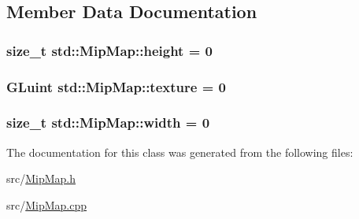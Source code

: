 \subsection{Member Data Documentation}
\hypertarget{classstd_1_1MipMap_a3baac3b8d33da5400b4a4bbca8604436}{}
\subsubsection[{height}]{\setlength{\rightskip}{0pt plus 5cm}size\+\_\+t std\+::\+Mip\+Map\+::height = 0\hspace{0.3cm}{\ttfamily [private]}}\label{classstd_1_1MipMap_a3baac3b8d33da5400b4a4bbca8604436}
\hypertarget{classstd_1_1MipMap_a9ae62495e98f75e2d545634a0a8b4a61}{}
\subsubsection[{texture}]{\setlength{\rightskip}{0pt plus 5cm}G\+Luint std\+::\+Mip\+Map\+::texture = 0\hspace{0.3cm}{\ttfamily [private]}}\label{classstd_1_1MipMap_a9ae62495e98f75e2d545634a0a8b4a61}
\hypertarget{classstd_1_1MipMap_aa7c7e74f1f05b2d8244f1d06289b18b4}{}
\subsubsection[{width}]{\setlength{\rightskip}{0pt plus 5cm}size\+\_\+t std\+::\+Mip\+Map\+::width = 0\hspace{0.3cm}{\ttfamily [private]}}\label{classstd_1_1MipMap_aa7c7e74f1f05b2d8244f1d06289b18b4}


The documentation for this class was generated from the following files\+:\begin{DoxyCompactItemize}
\item 
src/\hyperlink{MipMap_8h}{Mip\+Map.\+h}\item 
src/\hyperlink{MipMap_8cpp}{Mip\+Map.\+cpp}\end{DoxyCompactItemize}
